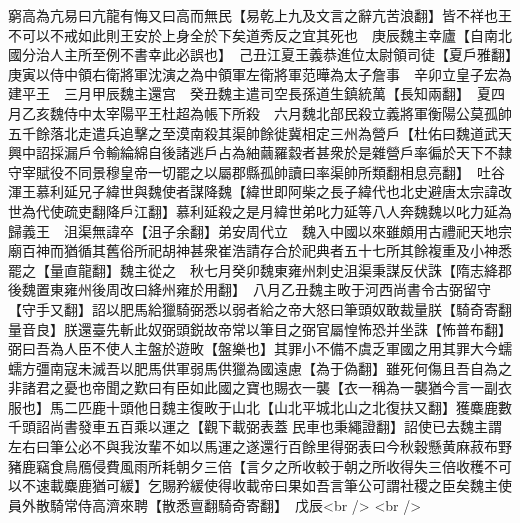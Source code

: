 窮高為亢易曰亢龍有悔又曰高而無民【易乾上九及文言之辭亢苦浪翻】皆不祥也王不可以不戒如此則王安於上身全於下矣道秀反之宜其死也　庚辰魏主幸廬【自南北國分治人主所至例不書幸此必誤也】　己丑江夏王義恭進位太尉領司徒【夏戶雅翻】　庚寅以侍中領右衛將軍沈演之為中領軍左衛將軍范曄為太子詹事　辛卯立皇子宏為建平王　三月甲辰魏主還宫　癸丑魏主遣司空長孫道生鎮統萬【長知兩翻】　夏四月乙亥魏侍中太宰陽平王杜超為帳下所殺　六月魏北部民殺立義將軍衡陽公莫孤帥五千餘落北走遣兵追擊之至漠南殺其渠帥餘徙冀相定三州為營戶【杜佑曰魏道武天興中詔採漏戶令輸綸綿自後諸逃戶占為紬繭羅縠者甚衆於是雜營戶率徧於天下不隸守宰賦役不同景穆皇帝一切罷之以屬郡縣孤帥讀曰率渠帥所類翻相息亮翻】　吐谷渾王慕利延兄子緯世與魏使者謀降魏【緯世即阿柴之長子緯代也北史避唐太宗諱改世為代使疏吏翻降戶江翻】慕利延殺之是月緯世弟叱力延等八人奔魏魏以叱力延為歸義王　沮渠無諱卒【沮子余翻】弟安周代立　魏入中國以來雖頗用古禮祀天地宗廟百神而猶循其舊俗所祀胡神甚衆崔浩請存合於祀典者五十七所其餘複重及小神悉罷之【量直龍翻】魏主從之　秋七月癸卯魏東雍州刺史沮渠秉謀反伏誅【隋志絳郡後魏置東雍州後周改曰絳州雍於用翻】　八月乙丑魏主畋于河西尚書令古弼留守【守手又翻】詔以肥馬給獵騎弼悉以弱者給之帝大怒曰筆頭奴敢裁量朕【騎奇寄翻量音良】朕還臺先斬此奴弼頭鋭故帝常以筆目之弼官屬惶怖恐并坐誅【怖普布翻】弼曰吾為人臣不使人主盤於遊畋【盤樂也】其罪小不備不虞乏軍國之用其罪大今蠕蠕方彊南寇未滅吾以肥馬供軍弱馬供獵為國遠慮【為于偽翻】雖死何傷且吾自為之非諸君之憂也帝聞之歎曰有臣如此國之寶也賜衣一襲【衣一稱為一襲猶今言一副衣服也】馬二匹鹿十頭他日魏主復畋于山北【山北平城北山之北復扶又翻】獲麋鹿數千頭詔尚書發車五百乘以運之【觀下載弼表蓋民車也秉繩證翻】詔使已去魏主謂左右曰筆公必不與我汝輩不如以馬運之遂還行百餘里得弼表曰今秋穀懸黄麻菽布野豬鹿竊食鳥鴈侵費風雨所耗朝夕三倍【言夕之所收較于朝之所收得失三倍收穫不可以不速載麋鹿猶可緩】乞賜矜緩使得收載帝曰果如吾言筆公可謂社稷之臣矣魏主使員外散騎常侍高濟來聘【散悉亶翻騎奇寄翻】　戊辰<br />
<br />
